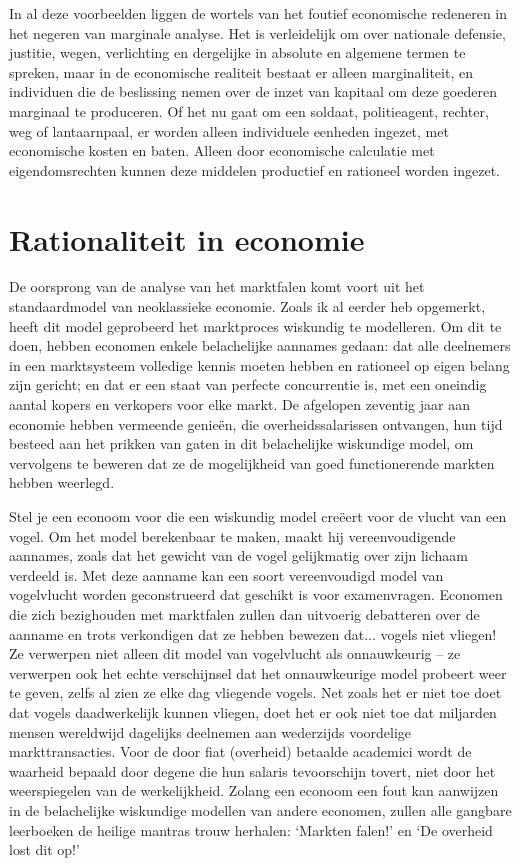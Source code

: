 In al deze voorbeelden liggen de wortels van het foutief economische redeneren in het negeren van marginale analyse. Het is verleidelijk om over nationale defensie, justitie, wegen, verlichting en dergelijke in absolute en algemene termen te spreken, maar in de economische realiteit bestaat er alleen marginaliteit, en individuen die de beslissing nemen over de inzet van kapitaal om deze goederen marginaal te produceren. Of het nu gaat om een soldaat, politieagent, rechter, weg of lantaarnpaal, er worden alleen individuele eenheden ingezet, met economische kosten en baten. Alleen door economische calculatie met eigendomsrechten kunnen deze middelen productief en rationeel worden ingezet.

\hypertarget{rationaliteit-in-economie}{%
\section{Rationaliteit in economie}\label{rationaliteit-in-economie}}

De oorsprong van de analyse van het marktfalen komt voort uit het standaardmodel van neoklassieke economie. Zoals ik al eerder heb opgemerkt, heeft dit model geprobeerd het marktproces wiskundig te modelleren. Om dit te doen, hebben economen enkele belachelijke aannames gedaan: dat alle deelnemers in een marktsysteem volledige kennis moeten hebben en rationeel op eigen belang zijn gericht; en dat er een staat van perfecte concurrentie is, met een oneindig aantal kopers en verkopers voor elke markt. De afgelopen zeventig jaar aan economie hebben vermeende genieën, die overheidssalarissen ontvangen, hun tijd besteed aan het prikken van gaten in dit belachelijke wiskundige model, om vervolgens te beweren dat ze de mogelijkheid van goed functionerende markten hebben weerlegd.

Stel je een econoom voor die een wiskundig model creëert voor de vlucht van een vogel. Om het model berekenbaar te maken, maakt hij vereenvoudigende aannames, zoals dat het gewicht van de vogel gelijkmatig over zijn lichaam verdeeld is. Met deze aanname kan een soort vereenvoudigd model van vogelvlucht worden geconstrueerd dat geschikt is voor examenvragen. Economen die zich bezighouden met marktfalen zullen dan uitvoerig debatteren over de aanname en trots verkondigen dat ze hebben bewezen dat... vogels niet vliegen! Ze verwerpen niet alleen dit model van vogelvlucht als onnauwkeurig -- ze verwerpen ook het echte verschijnsel dat het onnauwkeurige model probeert weer te geven, zelfs al zien ze elke dag vliegende vogels. Net zoals het er niet toe doet dat vogels daadwerkelijk kunnen vliegen, doet het er ook niet toe dat miljarden mensen wereldwijd dagelijks deelnemen aan wederzijds voordelige markttransacties. Voor de door fiat (overheid) betaalde academici wordt de waarheid bepaald door degene die hun salaris tevoorschijn tovert, niet door het weerspiegelen van de werkelijkheid. Zolang een econoom een fout kan aanwijzen in de belachelijke wiskundige modellen van andere economen, zullen alle gangbare leerboeken de heilige mantra\textquotesingle s trouw herhalen: `Markten falen!' en `De overheid lost dit op!'

